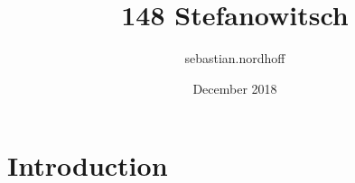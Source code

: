 \documentclass{article}
\title{148 Stefanowitsch}
\author{sebastian.nordhoff }
\date{December 2018}
\begin{document}
\maketitle

\section{Introduction}
\end{document}
